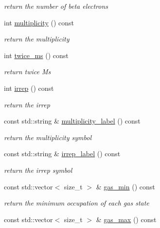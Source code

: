 \begin{DoxyCompactItemize}
\begin{DoxyCompactList}\small\item\em return the number of beta electrons \end{DoxyCompactList}\item 
int \mbox{\hyperlink{classforte_1_1_state_info_a3cfa6b9cf9cb9b22ba3c087cf46e8ce1}{multiplicity}} () const
\begin{DoxyCompactList}\small\item\em return the multiplicity \end{DoxyCompactList}\item 
int \mbox{\hyperlink{classforte_1_1_state_info_aecba70ee7401a519978f6960637175e8}{twice\+\_\+ms}} () const
\begin{DoxyCompactList}\small\item\em return twice Ms \end{DoxyCompactList}\item 
int \mbox{\hyperlink{classforte_1_1_state_info_a6fc39a9719c18b179d9ab83992990e31}{irrep}} () const
\begin{DoxyCompactList}\small\item\em return the irrep \end{DoxyCompactList}\item 
const std\+::string \& \mbox{\hyperlink{classforte_1_1_state_info_a49928add8977306add867d93df651730}{multiplicity\+\_\+label}} () const
\begin{DoxyCompactList}\small\item\em return the multiplicity symbol \end{DoxyCompactList}\item 
const std\+::string \& \mbox{\hyperlink{classforte_1_1_state_info_a8f5882f7c4b51f1bb43da3b4038763a1}{irrep\+\_\+label}} () const
\begin{DoxyCompactList}\small\item\em return the irrep symbol \end{DoxyCompactList}\item 
const std\+::vector$<$ size\+\_\+t $>$ \& \mbox{\hyperlink{classforte_1_1_state_info_afead0369c4c893b73c1e22c020358f6c}{gas\+\_\+min}} () const
\begin{DoxyCompactList}\small\item\em return the minimum occupation of each gas state \end{DoxyCompactList}\item 
const std\+::vector$<$ size\+\_\+t $>$ \& \mbox{\hyperlink{classforte_1_1_state_info_a7f87e4ae590b1e723fd2cab3a29673fd}{gas\+\_\+max}} () const

\end{DoxyCompactItemize}
